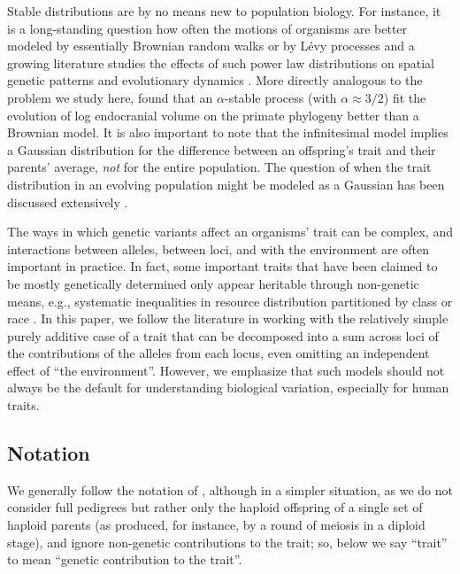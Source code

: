 \documentclass{article}
\newcommand{\1}{\mathbbm{1}}
\theoremstyle{remark}
\theoremstyle{definition}
\begin{document}
Stable distributions are by no means new to population biology.
For instance, it is a long-standing question how often the motions of organisms
are better modeled by essentially Brownian random walks or by L\'evy processes \citep{benhamou2007animals}
and a growing literature studies the effects of such power law distributions
on spatial genetic patterns and evolutionary dynamics
\citep[e.g.,][]{paulose2019spatial,smith2023isolation}.
More directly analogous to the problem we study here, \citet{landis2012phylogenetic}
found that an $\alpha$-stable process (with $\alpha \approx 3/2$) fit the evolution of log endocranial volume
on the primate phylogeny
better than a Brownian model.
It is also important to note that
the infinitesimal model implies a Gaussian distribution for the difference between an offspring's trait and their parents' average,
\emph{not} for the entire population.
The question of when the trait distribution in an evolving population
might be modeled as a Gaussian has been discussed extensively
\citep[e.g.,][]{turelli1994genetic,dbarre2015evolution}.

The ways in which genetic variants affect an organisms' trait can be complex,
and interactions between alleles, between loci, and with the environment are often important in practice.
In fact, some important traits that have been claimed to be mostly genetically determined 
only appear heritable through non-genetic means,
e.g., systematic inequalities in resource distribution partitioned by class or race
\citep[e.g.,][]{davenport1916hereditary}.
In this paper, we follow the literature in working with the relatively simple purely additive case
of a trait that can be decomposed into a sum across loci of the contributions of the alleles from each locus,
even omitting an independent effect of ``the environment''.
However, we emphasize that such models should not always be the default for understanding biological variation,
especially for human traits.

\subsection*{Notation}

We generally follow the notation of \citet{barton2017infinitesimal},
although in a simpler situation,
as we do not consider full pedigrees
but rather only the haploid offspring of a single set of haploid parents
(as produced, for instance, by a round of meiosis in a diploid stage),
and ignore non-genetic contributions to the trait;
so, below we say ``trait'' to mean ``genetic contribution to the trait''.
\end{document}
